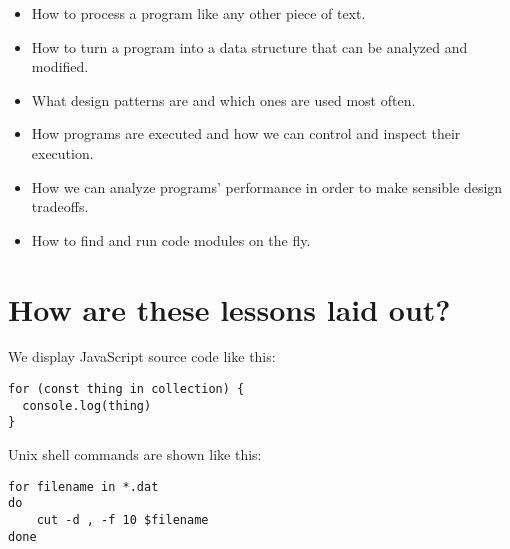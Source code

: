 \documentclass[krantzl]{krantz}
\begin{document}
\begin{itemize}

\item 

How to process a program like any other piece of text.



\item 

How to turn a program into a data structure that can be analyzed and modified.



\item 

What design patterns are and which ones are used most often.



\item 

How programs are executed and how we can control and inspect their execution.



\item 

How we can analyze programs’ performance in order to make sensible design tradeoffs.



\item 

How to find and run code modules on the fly.



\end{itemize}


\newpage

\section{How are these lessons laid out?}\label{introduction-layout}


We display JavaScript source code like this:


\begin{lstlisting}[frame=tblr]
for (const thing in collection) {
  console.log(thing)
}
\end{lstlisting}



\noindent Unix shell commands are shown like this:


\begin{lstlisting}[frame=shadowbox]
for filename in *.dat
do
    cut -d , -f 10 $filename
done
\end{lstlisting}
\end{document}

